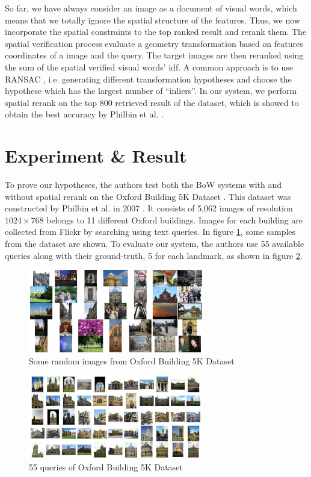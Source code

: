 \documentclass[10pt,conference,]{IEEEtran}
\begin{document}
So far, we have always consider an image as a document of visual words, which means that we totally ignore the spatial structure of the features. Thus, we now incorporate the spatial constraints to the top ranked result and rerank them. The spatial verification process evaluate a geometry transformation based on features coordinates of a image and the query. The target images are then reranked using the sum of the spatial verified visual words' idf. A common approach is to use RANSAC \cite{Fischler1981}, i.e. generating different transformation hypotheses and choose the hypothese which has the largest number of ``inliers''. In our system, we perform spatial rerank on the top 800 retrieved result of the dataset, which is showed to obtain the best accuracy by Philbin et al. \cite{2}.

\section{Experiment \& Result} \label{section:experiment_result}

To prove our hypotheses, the authors test both the BoW systems with and without spatial rerank on the Oxford Building 5K Dataset \cite{oxbuilding}. This dataset was constructed by Philbin et al. in 2007 \cite{2}. It consists of 5,062 images of resolution $1024 \times 768$ belongs to 11 different Oxford buildings. Images for each building are collected from Flickr by searching using text queries. In figure \ref{fig:oxbuilding}, some samples from the dataset are shown. To evaluate our system, the authors use 55 available queries along with their ground-truth, 5 for each landmark, as shown in figure \ref{fig:oxbuilding_query}. 

\begin{figure}
    \centering
    \includegraphics[width=3.0in]{oxbuilding.jpg}
    \caption{Some random images from Oxford Building 5K Dataset}
    \label{fig:oxbuilding}
\end{figure}

\begin{figure}
    \centering
    \includegraphics[width=3.0in]{oxbuilding_query.jpg}
    \caption{55 queries of Oxford Building 5K Dataset}
    \label{fig:oxbuilding_query}
\end{figure}




\end{document}
